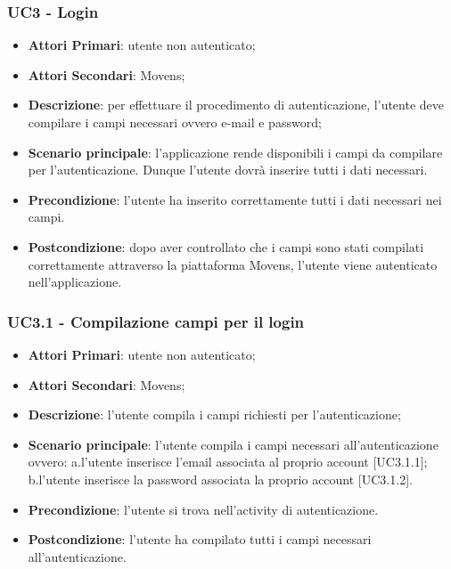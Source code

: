 
\subsubsection{UC3 - Login}
\begin{itemize}
	\item \textbf{Attori Primari}: utente non autenticato;
	\item \textbf{Attori Secondari}: Movens\glo;
	\item \textbf{Descrizione}: per effettuare il procedimento di autenticazione, l'utente deve compilare i campi necessari ovvero e-mail e password;
	\item \textbf{Scenario principale}: l'applicazione rende disponibili i campi da compilare per l'autenticazione. Dunque l'utente dovrà inserire tutti i dati necessari.
	
	\item \textbf{Precondizione}: l'utente ha inserito correttamente tutti i dati necessari nei campi.
	\item \textbf{Postcondizione}: dopo aver controllato che i campi sono stati compilati correttamente attraverso la piattaforma Movens\glo, l'utente viene autenticato nell'applicazione.	
\end{itemize}

\subsubsection{UC3.1 - Compilazione campi per il login}
\begin{itemize}
	\item \textbf{Attori Primari}: utente non autenticato;
	\item \textbf{Attori Secondari}: Movens\glo;
	\item \textbf{Descrizione}: l'utente compila i campi richiesti per l'autenticazione;
	\item \textbf{Scenario principale}: l'utente compila i campi necessari all'autenticazione ovvero: a.l'utente inserisce l'email associata al proprio account [UC3.1.1];
	\newline
	b.l'utente inserisce la password associata la proprio account [UC3.1.2].	
	\item \textbf{Precondizione}: l'utente si trova nell'activity di autenticazione.
	\item \textbf{Postcondizione}: l'utente ha compilato tutti i campi necessari all'autenticazione.	
\end{itemize}

